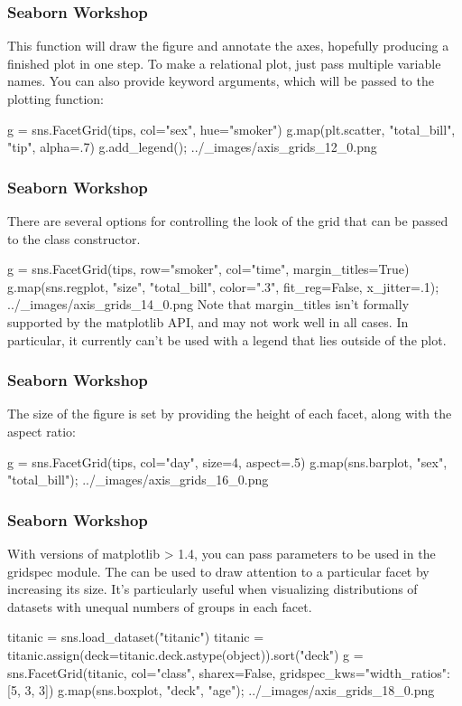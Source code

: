 \begin{frame}[fragile]
\frametitle{Seaborn Workshop}
\large
This function will draw the figure and annotate the axes, hopefully producing a finished plot in one step. To make a relational plot, just pass multiple variable names. You can also provide keyword arguments, which will be passed to the plotting function:

g = sns.FacetGrid(tips, col="sex", hue="smoker")
g.map(plt.scatter, "total_bill", "tip", alpha=.7)
g.add_legend();
../_images/axis_grids_12_0.png
\end{frame}
\begin{frame}[fragile]
\frametitle{Seaborn Workshop}
\large

There are several options for controlling the look of the grid that can be passed to the class constructor.

g = sns.FacetGrid(tips, row="smoker", col="time", margin_titles=True)
g.map(sns.regplot, "size", "total_bill", color=".3", fit_reg=False, x_jitter=.1);
../_images/axis_grids_14_0.png
Note that margin_titles isn’t formally supported by the matplotlib API, and may not work well in all cases. In particular, it currently can’t be used with a legend that lies outside of the plot.
\end{frame}
\begin{frame}[fragile]
\frametitle{Seaborn Workshop}
\large
The size of the figure is set by providing the height of each facet, along with the aspect ratio:

g = sns.FacetGrid(tips, col="day", size=4, aspect=.5)
g.map(sns.barplot, "sex", "total_bill");
../_images/axis_grids_16_0.png

\end{frame}
\begin{frame}[fragile]
\frametitle{Seaborn Workshop}
\large
With versions of matplotlib > 1.4, you can pass parameters to be used in the gridspec module. The can be used to draw attention to a particular facet by increasing its size. It’s particularly useful when visualizing distributions of datasets with unequal numbers of groups in each facet.

titanic = sns.load_dataset("titanic")
titanic = titanic.assign(deck=titanic.deck.astype(object)).sort("deck")
g = sns.FacetGrid(titanic, col="class", sharex=False,
                  gridspec_kws={"width_ratios": [5, 3, 3]})
g.map(sns.boxplot, "deck", "age");
../_images/axis_grids_18_0.png
\end{frame}
